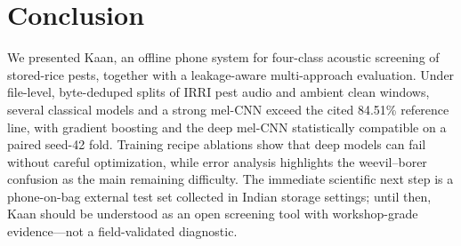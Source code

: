 \section{Conclusion}
\label{sec:conclusion}

We presented Kaan, an offline phone system for four-class acoustic screening of stored-rice pests, together with a leakage-aware multi-approach evaluation.
Under file-level, byte-deduped splits of IRRI pest audio and ambient clean windows, several classical models and a strong mel-CNN exceed the cited 84.51\% reference line, with gradient boosting and the deep mel-CNN statistically compatible on a paired seed-42 fold.
Training recipe ablations show that deep models can fail without careful optimization, while error analysis highlights the weevil--borer confusion as the main remaining difficulty.
The immediate scientific next step is a phone-on-bag external test set collected in Indian storage settings; until then, Kaan should be understood as an open screening tool with workshop-grade evidence---not a field-validated diagnostic.
